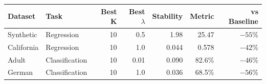 \begin{tabular}{llrrrrr}
\toprule
Dataset & Task & Best K & Best $\lambda$ & Stability & Metric & vs Baseline \\
\midrule
Synthetic & Regression & 10 & 0.5 & 1.98 & 25.47 & $-55\%$ \\
California & Regression & 10 & 1.0 & 0.044 & 0.578 & $-42\%$ \\
Adult & Classification & 10 & 0.01 & 0.090 & 82.6\% & $-46\%$ \\
German & Classification & 10 & 1.0 & 0.036 & 68.5\% & $-56\%$ \\
\bottomrule
\end{tabular}
